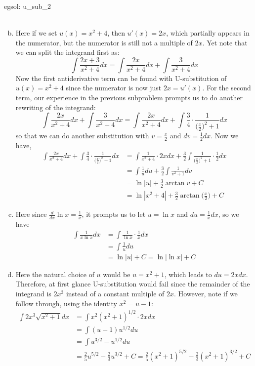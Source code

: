 \begin{egsol}[]{egsol: u_sub_2}
\begin{enumerate}[a)]
\begin{align*}
        \end{align*}
        \item Here if we set $u(x) = x^2 + 4$, then $u'(x) = 2x$, which partially appears in the numerator, but the numerator is still not a multiple of $2x$.  Yet note that we can split the integrand first as:
        \[\int \frac{2x+3}{x^2+4} dx = \int \frac{2x}{x^2+4} dx + \int \frac{3}{x^2+4} dx\]
        Now the first antiderivative term can be found with U-substitution of $u(x) = x^2 + 4$ since the numerator is now just $2x = u'(x)$.  For the second term, our experience in the previous subproblem prompts us to do another rewriting of the integrand:
        \[\int \frac{2x}{x^2+4} dx + \int \frac{3}{x^2+4} dx= \int \frac{2x}{x^2+4} dx+ \int\frac{3}{4}\cdot\frac{1}{\big(\frac{x}{2}\big)^2+1}dx\]
        so that we can do another substitution with $v = \frac{x}{2}$ and $dv = \frac{1}{2}dx$.  Now we have,
        \begin{align*}
            \int \frac{2x}{x^2+4} dx+ \int\frac{3}{4}\cdot\frac{1}{\big(\frac{x}{2}\big)^2+1}dx &= \int \frac{1}{x^2+4} \cdot 2xdx+ \frac{3}{2}\int\frac{1}{\big(\frac{x}{2}\big)^2+1} \cdot \frac{1}{2}dx\\
            &= \int \frac{1}{u} du + \frac{3}{2}\int\frac{1}{v^2+1}dv\\
            &= \ln |u| + \frac{3}{2}\arctan v + C\\
            &= \ln |x^2 + 4| + \frac{3}{2} \arctan\big(\frac{x}{2}\big) + C
        \end{align*}
        \item Here since $\frac{d}{dx} \ln x = \frac{1}{x}$, it prompts us to let $u = \ln x$ and $du = \frac{1}{x} dx$, so we have
        \begin{align*}
            \int \frac{1}{x \ln x} dx &= \int \frac{1}{\ln x} \cdot \frac{1}{x}dx\\
            &= \int \frac{1}{u} du\\
            &= \ln |u| + C = \ln |\ln x| + C
        \end{align*}
        \item Here the natural choice of $u$ would be $u = x^2+1$, which leads to $du = 2xdx$.  Therefore, at first glance U-substitution would fail since the remainder of the integrand is $2x^3$ instead of a constant multiple of $2x$.  However, note if we follow through, using the identity $x^2 = u - 1$:
        \begin{align*}
            \int 2x^3 \sqrt{x^2 + 1}dx &= \int x^2 (x^2+1)^{1/2} \cdot 2xdx\\
            &= \int (u-1) u^{1/2} du\\
            &= \int u^{3/2} - u^{1/2} du\\
            &= \frac{2}{5}u^{5/2} - \frac{2}{3}u^{3/2} + C = \frac{2}{5}(x^2+1)^{5/2} - \frac{2}{3}(x^2+1)^{3/2} + C
        \end{align*}
    \end{enumerate}
\end{egsol}
